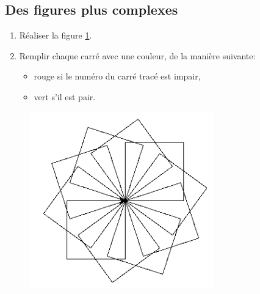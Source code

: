 \documentclass[a4paper,11pt]{article}
\begin{document}
\begin{Form}
\subsection{Des figures plus complexes}
\begin{activite}
\begin{enumerate}
\item Réaliser la figure \ref{carres}.
\item Remplir chaque carré avec une couleur, de la manière suivante:
\begin{itemize}
\item rouge si le numéro du carré tracé est impair,
\item vert s'il est pair.
\end{itemize}
\end{enumerate}
\end{activite}
\begin{figure}[!h]
\centering
\includegraphics[width=8cm]{ressources/carres.png}
\label{carres}
\end{figure}


\end{Form}
\end{document}
